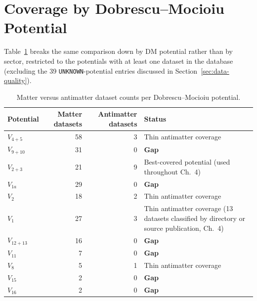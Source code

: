 \documentclass[main]{subfiles}
\begin{document}
\section{Coverage by Dobrescu--Mocioiu Potential}
\label{sec:potential-gaps}

Table~\ref{tab:potential-gaps} breaks the same comparison down by DM
potential rather than by sector, restricted to the potentials with at least
one dataset in the database (excluding the 39 \texttt{UNKNOWN}-potential
entries discussed in Section~\ref{sec:data-quality}).

\begin{table}[h]
\centering
\begin{tabular}{@{}l r r >{\raggedright\arraybackslash}p{4.5cm}@{}}
\toprule
Potential & Matter datasets & Antimatter datasets & Status \\
\midrule
$V_{4+5}$  & 58 & 3 & Thin antimatter coverage \\
$V_{9+10}$ & 31 & 0 & \textbf{Gap} \\
$V_{2+3}$  & 21 & 9 & Best-covered potential (used throughout Ch.~4) \\
$V_{1a}$   & 29 & 0 & \textbf{Gap} \\
$V_2$      & 18 & 2 & Thin antimatter coverage \\
$V_1$      & 27 & 3 & Thin antimatter coverage (13 datasets classified by directory or source publication, Ch.~4) \\
$V_{12+13}$& 16 & 0 & \textbf{Gap} \\
$V_{11}$   & 7  & 0 & \textbf{Gap} \\
$V_8$      & 5  & 1 & Thin antimatter coverage \\
$V_{15}$   & 2  & 0 & \textbf{Gap} \\
$V_{16}$   & 2  & 0 & \textbf{Gap} \\
\bottomrule
\end{tabular}
\caption{Matter versus antimatter dataset counts per Dobrescu--Mocioiu potential.}
\label{tab:potential-gaps}
\end{table}
\end{document}
